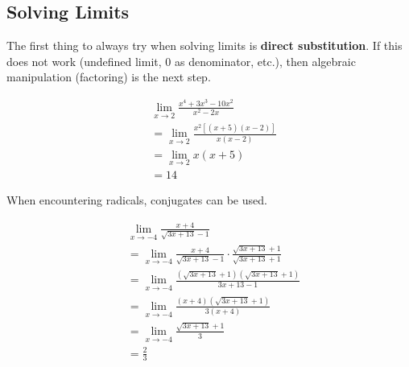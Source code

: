 \documentclass[12pt]{article}
\begin{document}
            \begin{figure}[H]
                \begin{center}
                    \caption[Figure 2]{}
                    \label{fig:limproperties}
                \end{center}
            \end{figure}

        \subsection{Solving Limits}
            The first thing to always try when solving limits is \textbf{direct substitution}. If this does not work (undefined limit, 0 as denominator, etc.), then algebraic manipulation (factoring) is the next step.

            \begin{align*}
                &\lim_{x \to 2} \frac{x^4 + 3x^3 - 10x^2}{x^2 - 2x} \\[6pt]
                &= \lim_{x \to 2} \frac{x^2\left[ (x+5)(x-2) \right]}{x(x-2)} \\
                &= \lim_{x \to 2} x(x+5) \\
                &= 14
            \end{align*}

            \noindent When encountering radicals, conjugates can be used.

            \begin{align*}
                &\lim_{x \to -4} \frac{x+4}{\sqrt{3x+13}-1} \\[6pt]
                &= \lim_{x \to -4} \frac{x+4}{\sqrt{3x+13}-1} \cdot \frac{\sqrt{3x+13}+1}{\sqrt{3x+13}+1} \\[6pt]
                &= \lim_{x \to -4} \frac{(\sqrt{3x+13}+1)(\sqrt{3x+13}+1)}{3x+13-1} \\[6pt]
                &= \lim_{x \to -4} \frac{(x+4)(\sqrt{3x+13}+1)}{3(x+4)} \\[6pt]
                &= \lim_{x \to -4} \frac{\sqrt{3x+13}+1}{3} \\[6pt]
                &= \frac{2}{3}
            \end{align*}
\end{document}
